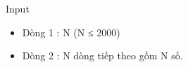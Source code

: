Input
\begin{itemize}
	\item Dòng 1 : N (N ≤ 2000)
	\item Dòng 2 : N dòng tiếp theo gồm N số.
\end{itemize}